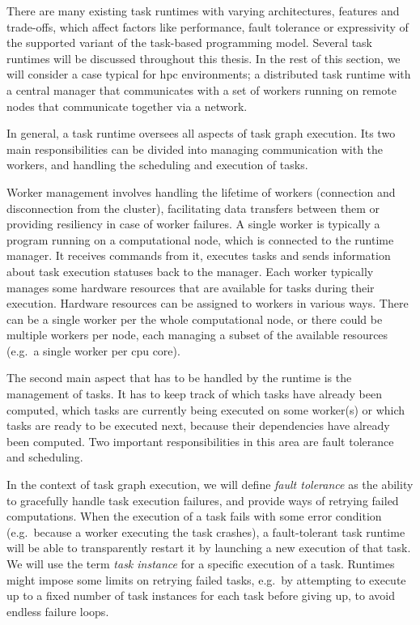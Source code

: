 There are many existing task runtimes with varying architectures, features and trade-offs, which
affect factors like performance, fault tolerance or expressivity of the supported variant of the
task-based programming model. Several task runtimes will be discussed throughout this thesis. In
the rest of this section, we will consider a case typical for \gls{hpc} environments;
a distributed task runtime with a central manager that communicates with a set of workers running
on remote nodes that communicate together via a network.

In general, a task runtime oversees all aspects of task graph execution. Its two main
responsibilities can be divided into managing communication with the workers, and handling the
scheduling and execution of tasks.

Worker management involves handling the lifetime of workers (connection and disconnection from the
cluster), facilitating data transfers between them or providing resiliency in case of worker
failures. A single worker is typically a program running on a computational node, which is
connected to the runtime manager. It receives commands from it, executes tasks and sends
information about task execution statuses back to the manager. Each worker typically manages some
hardware resources that are available for tasks during their execution. Hardware resources can be
assigned to workers in various ways. There can be a single worker per the whole computational node,
or there could be multiple workers per node, each managing a subset of the available resources
(e.g.\ a single worker per \gls{cpu} core).

The second main aspect that has to be handled by the runtime is the management of tasks. It has to
keep track of which tasks have already been computed, which tasks are currently being executed on
some worker(s) or which tasks are ready to be executed next, because their dependencies have
already been computed. Two important responsibilities in this area are fault tolerance and
scheduling.

In the context of task graph execution, we will define \emph{fault tolerance} as the ability to
gracefully handle task execution failures, and provide ways of retrying failed computations. When
the execution of a task fails with some error condition (e.g.\ because a worker executing the task
crashes), a fault-tolerant task runtime will be able to transparently restart it by launching a new
execution of that task. We will use the term \emph{task instance} for a specific execution of a
task. Runtimes might impose some limits on retrying failed tasks, e.g.\ by attempting to execute up
to a fixed number of task instances for each task before giving up, to avoid endless failure loops.

